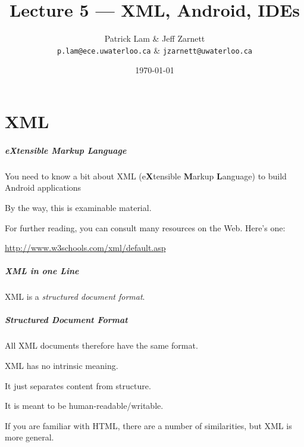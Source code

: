 

\usepackage{alltt}

\title{Lecture 5 --- XML, Android, IDEs}

\author{Patrick Lam \& Jeff Zarnett \\ \small \texttt{p.lam@ece.uwaterloo.ca} \& \texttt{jzarnett@uwaterloo.ca}}
\date{\today}





\begin{frame}
  \titlepage

\end{frame}

\part{XML}
\frame{\partpage}

\begin{frame}
\frametitle{eXtensible Markup Language}
\begin{changemargin}{1cm}
You need to know a bit about
XML (e\textbf{X}tensible \textbf{M}arkup \textbf{L}anguage)  to build Android applications 

By
the way, this is examinable material.

For further reading, you can consult many resources on the Web.
Here's one:
\begin{center}
\url{http://www.w3schools.com/xml/default.asp}
\end{center}

\end{changemargin}
\end{frame}

\begin{frame}
\frametitle{XML in one Line}
\begin{changemargin}{1cm}
\begin{center}
{\Large XML is a \emph{structured document format}.}
\end{center}
\end{changemargin}
\end{frame}

\begin{frame}
\frametitle{Structured Document Format}
\begin{changemargin}{1cm}
All XML documents therefore have the same format. 

XML has no intrinsic meaning. 

It just separates content from structure. 

It is meant to be human-readable/writable.

If you are familiar with HTML, there are a number of similarities, but XML is more general. 

\end{changemargin}
\end{frame}

